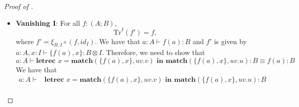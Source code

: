 \begin{proof}[Proof of ]
\begin{itemize}
\begin{align*}
\end{align*}
and
\begin{align*}
  \textbf{match}(\textbf{match}(f(a,x),uv.\{u,g(v)\}), uv.u) &\equiv \textbf{match}(\{\textbf{match}(f(a,x), \alpha\beta.\alpha), g(\textbf{match}(f(a,x), \alpha\beta.\beta))\}, uv.u)\\
  &\equiv \textbf{match}(f(a,x), \alpha\beta.\alpha).
\end{align*}
Hence,
\begin{align*}
a : A \vdash &\textbf{letrec } x = \textbf{match}(\textbf{match}(f(a,x), uv.\{u,g(v)\}), uv.v) \textbf{ in } \textbf{match}(\textbf{match}(f(a,x), uv. \{u, g(v)\}), uv.u) : B \equiv\\
&\equiv \textbf{letrec } x = g(\textbf{match}(f(a,x), \alpha\beta.\beta)) \textbf{ in } \textbf{match}(f(a,x), \alpha\beta.\alpha) : B\\
&\text{by \cref{lemma:letrec}}\\
&\equiv \textbf{letrec } x = (\textbf{letrec } y = \textbf{match}(f(a,x),\alpha\beta.\beta)) \textbf{ in } g(y)) \textbf{ in } \textbf{match}(f(a,x), \alpha\beta.\alpha)\\
&\text{by \cref{eq:let_equations:merge_bind}}\\
&\equiv \textbf{letrec } x = g(y), y = \textbf{match}(f(a,g(x)), \alpha\beta.\beta) \textbf{ in } \textbf{match}(f(a,x), \alpha\beta.\alpha) : B\\
&\text{by \cref{eq:let_equations:subst}}\\
&\equiv \textbf{letrec } x = g(y), y = \textbf{match}(f(a,g(y)), \alpha\beta.\beta) \textbf{ in } \textbf{match}(f(a,g(y)), \alpha\beta.\alpha) : B\\
&\text{by \cref{eq:let_equations:gc}}\\
&\equiv \textbf{letrec } y = \textbf{match}(f(a,g(y)), \alpha\beta.\beta) \textbf{ in } \textbf{match}(f(a,g(y)), \alpha\beta.\alpha) : B
  \end{align*}
Up to $\alpha$-equivalence this is what we needed.
\item \textbf{Vanishing I}: For all $f : (A;B)$,
\[
\text{Tr}^{I}(f') = f,
\]
where $f' = \xi_{B,I} \circ (f,id_{I})$.
We have that $a : A \vdash f(a) : B$ and $f'$ is given by $a : A, x : I \vdash \{f(a), x\} : B \otimes I$.
Therefore, we need to show that
\[
a : A \vdash \textbf{letrec } x = \textbf{match}(\{f(a), x\}, uv.v) \textbf{ in } \textbf{match}(\{f(a), x\}, uv.u) : B \equiv f(a) : B
\]
We have that
\begin{align*}
  a : A \vdash &\textbf{letrec } x = \textbf{match}(\{f(a), x\}, uv.v) \textbf{ in } \textbf{match}(\{f(a), x\}, uv.u) : B\\

\end{align*}
\end{itemize}
\end{proof}

